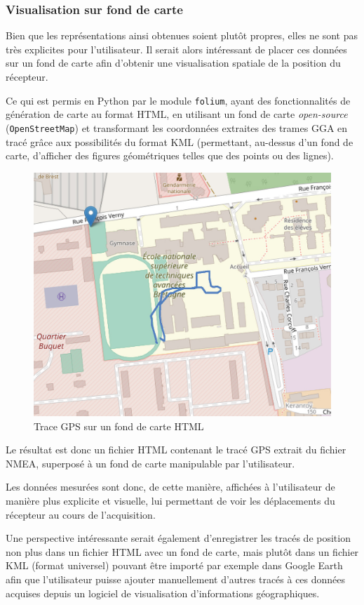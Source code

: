       \subsubsection{Visualisation sur fond de carte}
         Bien que les représentations ainsi obtenues soient plutôt propres, elles ne sont pas très explicites pour l'utilisateur.
         Il serait alors intéressant de placer ces données sur un fond de carte afin d'obtenir une visualisation spatiale de la position du récepteur.

         Ce qui est permis en Python par le module \texttt{folium}, ayant des fonctionnalités de génération de carte au format HTML, en utilisant un fond de carte \textit{open-source} (\texttt{OpenStreetMap}) et transformant les coordonnées extraites des trames GGA en tracé grâce aux possibilités du format KML (permettant, au-dessus d'un fond de carte, d'afficher des figures géométriques telles que des points ou des lignes).

         \begin{figure}[h]
             \centering
             \includegraphics[width=.95\textwidth]{imgs/gps_map_2}
             \caption{Trace GPS sur un fond de carte HTML}
             \label{fig:coords-on-map}
         \end{figure}

         Le résultat est donc un fichier HTML contenant le tracé GPS extrait du fichier NMEA, superposé à un fond de carte manipulable par l'utilisateur.

         Les données mesurées sont donc, de cette manière, affichées à l'utilisateur de manière plus explicite et visuelle, lui permettant de voir les déplacements du récepteur au cours de l'acquisition.

         Une perspective intéressante serait également d'enregistrer les tracés de position non plus dans un fichier HTML avec un fond de carte, mais plutôt dans un fichier KML (format universel) pouvant être importé par exemple dans Google Earth afin que l'utilisateur puisse ajouter manuellement d'autres tracés à ces données acquises depuis un logiciel de visualisation d'informations géographiques.